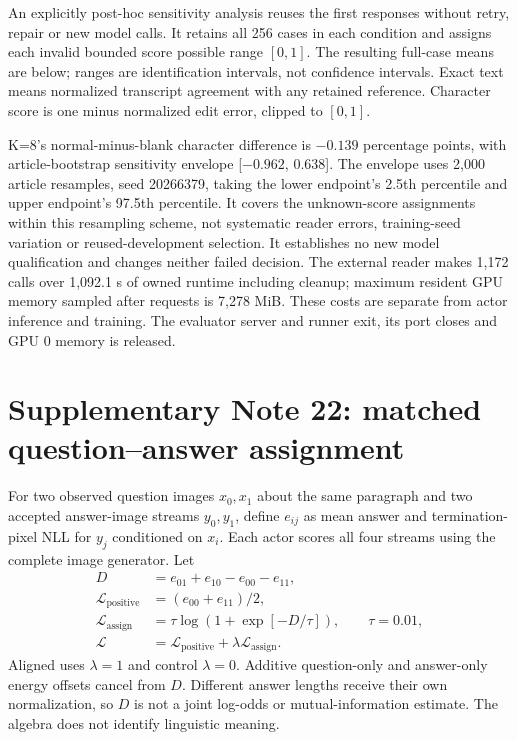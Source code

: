 \documentclass[10pt,a4paper]{article}
\begin{document}
An explicitly post-hoc sensitivity analysis reuses the first responses
without retry, repair or new model calls. It retains all 256 cases in each
condition and assigns each invalid bounded score possible range $[0,1]$.
The resulting full-case means are below; ranges are identification intervals,
not confidence intervals. Exact text means normalized transcript agreement
with any retained reference. Character score is one minus normalized edit
error, clipped to $[0,1]$.

K=8's normal-minus-blank character difference is $-0.139$ percentage points,
with article-bootstrap sensitivity envelope [$-0.962$, 0.638]. The envelope
uses 2,000 article resamples, seed 20266379, taking the lower endpoint's
2.5th percentile and upper endpoint's 97.5th percentile. It covers the
unknown-score assignments within this resampling scheme, not systematic
reader errors, training-seed variation or reused-development selection.
It establishes no new model qualification and changes neither failed decision.
The external reader makes 1,172 calls over 1,092.1 s of owned runtime including
cleanup; maximum resident GPU memory sampled after requests is 7,278 MiB.
These costs are separate from actor inference and training. The evaluator
server and runner exit, its port closes and GPU 0 memory is released.

\section*{Supplementary Note 22: matched question--answer assignment}
For two observed question images $x_0,x_1$ about the same paragraph and two
accepted answer-image streams $y_0,y_1$, define $e_{ij}$ as mean answer and
termination-pixel NLL for $y_j$ conditioned on $x_i$. Each actor scores all
four streams using the complete image generator. Let
\begin{align}
 D &= e_{01}+e_{10}-e_{00}-e_{11},\\
 \mathcal L_{\mathrm{positive}} &= (e_{00}+e_{11})/2,\\
 \mathcal L_{\mathrm{assign}} &= \tau\log(1+\exp[-D/\tau]),\qquad \tau=0.01,\\
 \mathcal L &= \mathcal L_{\mathrm{positive}}+\lambda\mathcal L_{\mathrm{assign}}.
\end{align}
Aligned uses $\lambda=1$ and control $\lambda=0$. Additive question-only and
answer-only energy offsets cancel from $D$. Different answer lengths receive
their own normalization, so $D$ is not a joint log-odds or mutual-information
estimate. The algebra does not identify linguistic meaning.
\end{document}
